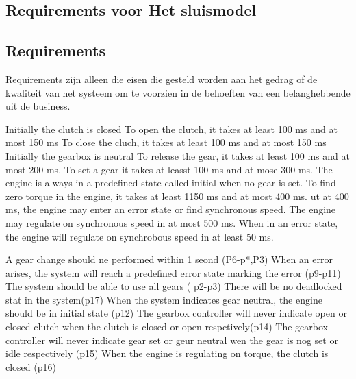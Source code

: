 {{{{{{{{{{{{{{\subsection{Requirements voor Het sluismodel}

 
\subsection{Requirements}
Requirements zijn alleen die eisen die gesteld worden aan het gedrag of de kwaliteit van het systeem om te voorzien in de behoeften van een belanghebbende uit de business.



Initially the clutch is closed
To open the clutch, it takes at least 100 ms and at most 150 ms
To close the cluch, it takes at least 100 ms and at most 150 ms
Initially the gearbox is neutral
To release the gear, it takes at least 100 ms and at most 200 ms.
To set a gear it takes at leasst 100 ms and at mose 300 ms.
The engine is always in a predefined state called initial when no gear is set.
To find zero torque in the engine, it takes at least 1150 ms and at most 400 ms. ut at 400 ms, the engine may enter an error state or find synchronous speed.
The  engine may regulate on synchronous speed in at most 500 ms.
When in an error state, the engine will regulate on synchrobous speed in at least 50 ms.


A gear change should ne performed within 1 seond (P6-p*,P3)
When an error arises, the system will reach a predefined error state marking the error (p9-p11)
The system should be able to use all gears ( p2-p3)
There will be no deadlocked stat in the system(p17)
When the system indicates gear neutral, the engine should  be in initial state (p12)
The gearbox controller will never indicate open or closed clutch when the clutch is closed or open respctively(p14)
The gearbox controller will never indicate gear set or geur neutral wen the gear is nog set or idle respectively (p15)
When the engine is regulating on torque, the clutch is closed (p16)








}}}}}}}}}}}}}}
